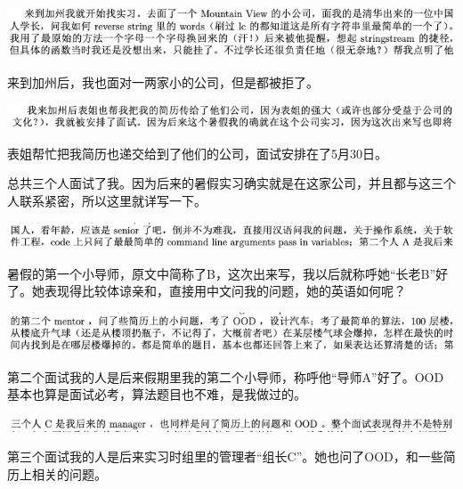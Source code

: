 \documentclass[9pt, b5paper]{article}
\begin{document}
\begin{center}
\includegraphics[width=.9\linewidth]{./pic/backups_plans_20210504_205325.png}
\end{center}

来到加州后，我也面对一两家小的公司，但是都被拒了。 

\begin{center}
\includegraphics[width=.9\linewidth]{./pic/backups_plans_20210504_205414.png}
\end{center}

表姐帮忙把我简历也递交给到了他们的公司，面试安排在了5月30日。

总共三个人面试了我。因为后来的暑假实习确实就是在这家公司，并且都与这三个人联系紧密，所以这里就详写一下。 

\begin{center}
\includegraphics[width=.9\linewidth]{./pic/backups_plans_20210504_205755.png}
\end{center}

暑假的第一个小导师，原文中简称了B，这次出来写，我以后就称呼她“长老B”好了。她表现得比较体谅亲和，直接用中文问我的问题，她的英语如何呢？

\begin{center}
\includegraphics[width=.9\linewidth]{./pic/backups_plans_20210504_205858.png}
\end{center}

第二个面试我的人是后来假期里我的第二个小导师，称呼他“导师A”好了。OOD基本也算是面试必考，算法题目也不难，是我做过的。 

\begin{center}
\includegraphics[width=.9\linewidth]{./pic/backups_plans_20210504_210005.png}
\end{center}

第三个面试我的人是后来实习时组里的管理者“组长C”。她也问了OOD，和一些简历上相关的问题。
\end{document}
